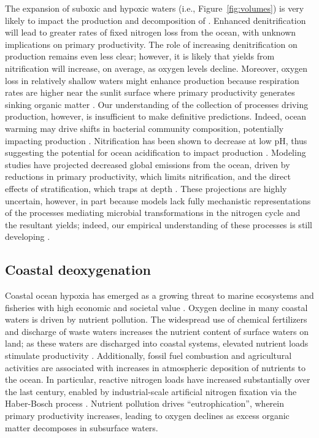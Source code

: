\documentclass{report_chapter}
\begin{document}
The expansion of suboxic and hypoxic waters (i.e., Figure~\ref{fig:volumes}) is very likely to impact the production and decomposition of \NNO{}.
Enhanced denitrification will lead to greater rates of fixed nitrogen loss from the ocean, with unknown implications on primary productivity.
The role of increasing denitrification on \NNO{} production remains even less clear; however, it is likely that \NNO{} yields from nitrification will increase, on average, as oxygen levels decline.
Moreover, oxygen loss in relatively shallow waters might enhance \NNO{} production because respiration rates are higher near the sunlit surface where primary productivity generates sinking organic matter \citep{Codispoti-2010}.
Our understanding of the collection of processes driving \NNO{} production, however, is insufficient to make definitive predictions.
Indeed, ocean warming may drive shifts in bacterial community composition, potentially impacting \NNO{} production \citep{Freing-Wallace-etal-2012}.
Nitrification has been shown to decrease at low pH, thus suggesting the potential for ocean acidification to impact \NNO{} production \citep{Beman-Chow-etal-2010}.
Modeling studies have projected decreased global \NNO{} emissions from the ocean, driven by reductions in primary productivity, which limits nitrification, and the direct effects of stratification, which traps \NNO{}  at depth \citep{Martinez-Rey-Bopp-etal-2015}.
These projections are highly uncertain, however, in part because models lack fully mechanistic representations of the processes mediating microbial transformations in the nitrogen cycle and the resultant \NNO{} yields; indeed, our empirical understanding of these processes is still developing \citep{Codispoti-2010}.

\subsection{Coastal deoxygenation}\label{loc:coastal}

Coastal ocean hypoxia has emerged as a growing threat to marine ecosystems and fisheries with high economic and societal value \citep{Diaz-Rosenberg-2008,McClatchie-Goericke-etal-2010}.
Oxygen decline in many coastal waters is driven by nutrient pollution.
The widespread use of chemical fertilizers and discharge of waste waters increases the nutrient content of surface waters on land; as these waters are discharged into coastal systems, elevated nutrient loads stimulate productivity \citep{Rabalais-Diaz-etal-2010}.
Additionally, fossil fuel combustion and agricultural activities are associated with increases in atmospheric deposition of nutrients to the ocean.
In particular, reactive nitrogen loads have increased substantially over the last century, enabled by industrial-scale artificial nitrogen fixation via the Haber-Bosch process \citep[e.g.,][]{Gruber-Galloway-2008}.
Nutrient pollution drives ``eutrophication'', wherein primary productivity increases, leading to oxygen declines as excess organic matter decomposes in subsurface waters.
\end{document}
